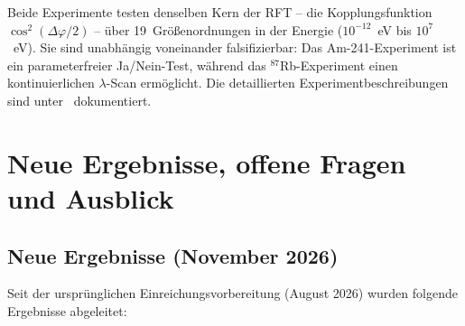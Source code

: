 \documentclass[12pt]{iopart}
\begin{document}
	Beide Experimente testen denselben Kern der RFT -- die
	Kopplungsfunktion $\cos^2(\Delta\varphi/2)$ -- \"uber
	19~Gr\"o\ss{}enordnungen in der Energie
	($10^{-12}$~eV bis $10^7$~eV). Sie sind unabh\"angig
	voneinander falsifizierbar: Das Am-241-Experiment ist ein
	parameterfreier Ja/Nein-Test, w\"ahrend das
	${}^{87}$Rb-Experiment einen kontinuierlichen
	$\lambda$-Scan erm\"oglicht. Die detaillierten
	Experimentbeschreibungen sind unter~\cite{rftrepo}
	dokumentiert.
	
	
	\section{Neue Ergebnisse, offene Fragen und Ausblick}
	
	\subsection{Neue Ergebnisse (November 2026)}
	\label{sec:neue_ergebnisse}
	
	Seit der ursprünglichen Einreichungsvorbereitung (August 2026)
	wurden folgende Ergebnisse abgeleitet:
	
\end{document}
